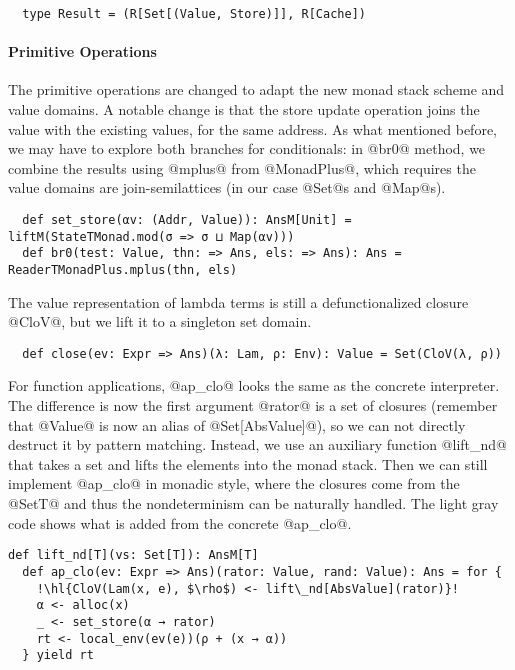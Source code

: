 \begin{lstlisting}
  type Result = (R[Set[(Value, Store)]], R[Cache])
\end{lstlisting}

\paragraph{Primitive Operations} The primitive operations are changed to adapt
the new monad stack scheme and value domains. A notable change is that the store
update operation joins the value with the existing values, for the same address.
As what mentioned before, we may have to explore both branches for conditionals:
in @br0@ method, we combine the results using @mplus@ from @MonadPlus@, which
requires the value domains are join-semilattices (in our case @Set@s and
@Map@s).

\begin{lstlisting}
  def set_store(αv: (Addr, Value)): AnsM[Unit] = liftM(StateTMonad.mod(σ => σ ⊔ Map(αv)))
  def br0(test: Value, thn: => Ans, els: => Ans): Ans = ReaderTMonadPlus.mplus(thn, els)
\end{lstlisting}

The value representation of lambda terms is still a defunctionalized closure
@CloV@, but we lift it to a singleton set domain.

\begin{lstlisting}
  def close(ev: Expr => Ans)(λ: Lam, ρ: Env): Value = Set(CloV(λ, ρ))
\end{lstlisting}

For function applications, @ap_clo@ looks the same as the concrete interpreter.
The difference is now the first argument @rator@ is a set of closures (remember
that @Value@ is now an alias of @Set[AbsValue]@), so we can not directly
destruct it by pattern matching. Instead, we use an auxiliary function @lift_nd@
that takes a set and lifts the elements into the monad stack. Then we can still
implement @ap_clo@ in monadic style, where the closures come from the @SetT@ and
thus the nondeterminism can be naturally handled. The light gray code shows what
is added from the concrete @ap_clo@.

\begin{lstlisting}[escapechar=!]
  def lift_nd[T](vs: Set[T]): AnsM[T]
  def ap_clo(ev: Expr => Ans)(rator: Value, rand: Value): Ans = for {
    !\hl{CloV(Lam(x, e), $\rho$) <- lift\_nd[AbsValue](rator)}!
    α <- alloc(x)
    _ <- set_store(α → rator)
    rt <- local_env(ev(e))(ρ + (x → α))
  } yield rt
\end{lstlisting}

